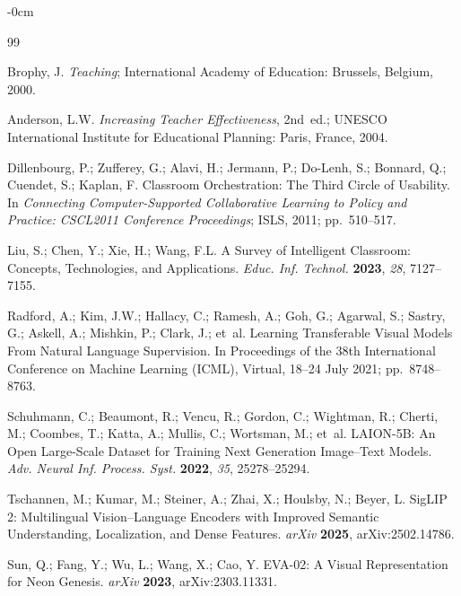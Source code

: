 \documentclass[electronics,article,submit,pdftex,moreauthors]{Definitions/mdpi}
\begin{document}
\begin{adjustwidth}{-\extralength}{0cm}


\begin{thebibliography}{99}

Brophy, J.
\textit{Teaching}; International Academy of Education: Brussels, Belgium, 2000.

Anderson, L.W.
\textit{Increasing Teacher Effectiveness}, 2nd~ed.; UNESCO International Institute for Educational Planning: Paris, France, 2004.

Dillenbourg, P.; Zufferey, G.; Alavi, H.; Jermann, P.; Do-Lenh, S.; Bonnard, Q.; Cuendet, S.; Kaplan, F.
Classroom Orchestration: The Third Circle of Usability.
In \textit{Connecting Computer-Supported Collaborative Learning to Policy and Practice: CSCL2011 Conference Proceedings}; ISLS, 2011; pp.~510--517.

Liu, S.; Chen, Y.; Xie, H.; Wang, F.L.
A Survey of Intelligent Classroom: Concepts, Technologies, and Applications.
\textit{Educ. Inf. Technol.} \textbf{2023}, \textit{28}, 7127--7155.

Radford, A.; Kim, J.W.; Hallacy, C.; Ramesh, A.; Goh, G.; Agarwal, S.; Sastry, G.; Askell, A.; Mishkin, P.; Clark, J.; et~al.
Learning Transferable Visual Models From Natural Language Supervision.
In Proceedings of the 38th International Conference on Machine Learning (ICML), Virtual, 18--24 July 2021; pp.~8748--8763.

Schuhmann, C.; Beaumont, R.; Vencu, R.; Gordon, C.; Wightman, R.; Cherti, M.; Coombes, T.; Katta, A.; Mullis, C.; Wortsman, M.; et~al.
LAION-5B: An Open Large-Scale Dataset for Training Next Generation Image--Text Models.
\textit{Adv. Neural Inf. Process. Syst.} \textbf{2022}, \textit{35}, 25278--25294.

Tschannen, M.; Kumar, M.; Steiner, A.; Zhai, X.; Houlsby, N.; Beyer, L.
SigLIP 2: Multilingual Vision--Language Encoders with Improved Semantic Understanding, Localization, and Dense Features.
\textit{arXiv} \textbf{2025}, arXiv:2502.14786.

Sun, Q.; Fang, Y.; Wu, L.; Wang, X.; Cao, Y.
EVA-02: A Visual Representation for Neon Genesis.
\textit{arXiv} \textbf{2023}, arXiv:2303.11331.


\end{thebibliography}
\end{adjustwidth}
\end{document}
